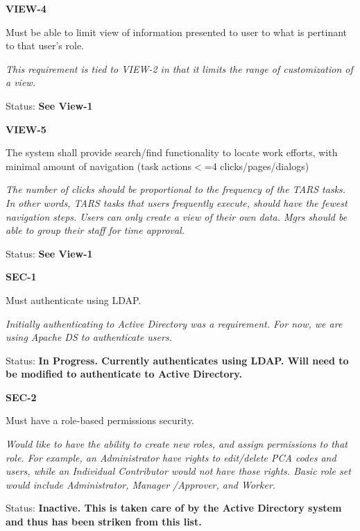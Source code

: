 \noindent 

\noindent \textbf{VIEW-4}

\noindent Must be able to limit view of information presented to user to what is pertinant to that user's role.

\textit{This requirement is tied to VIEW-2 in that it limits the range of customization of a view.}

Status: \textbf{See View-1}\\

\noindent 

\noindent \textbf{VIEW-5}

\noindent The system shall provide search/find functionality to locate work efforts, with minimal amount of navigation (task actions$<$=4 clicks/pages/dialogs)

\noindent \textit{The number of clicks should be proportional to the frequency of the TARS tasks. In other words, TARS tasks that users frequently execute, should have the fewest navigation steps. Users can only create a view of their own data. Mgrs should be able to group their staff for time approval.}

\noindent Status: \textbf{See View-1}\\

\noindent 

\noindent \textbf{SEC-1}

\noindent Must authenticate using LDAP.

\noindent \textit{Initially authenticating to Active Directory was a requirement. For now, we are using Apache DS to authenticate users. }

\noindent Status: \textbf{In Progress.  Currently authenticates using LDAP.  Will need to be modified to authenticate to Active Directory.}\textit{}\\

\noindent \textit{}

\noindent \textbf{SEC-2}

\noindent Must have a role-based permissions security.

\noindent \textit{Would like to have the ability to create new roles, and assign permissions to that role. For example, an Administrator have rights to edit/delete PCA codes and users, while an Individual Contributor would not have those rights. Basic role set would include Administrator, Manager /Approver, and Worker.}

\noindent Status: \textbf{Inactive.  This is taken care of by the Active Directory system and thus has been striken from this list.}\\

